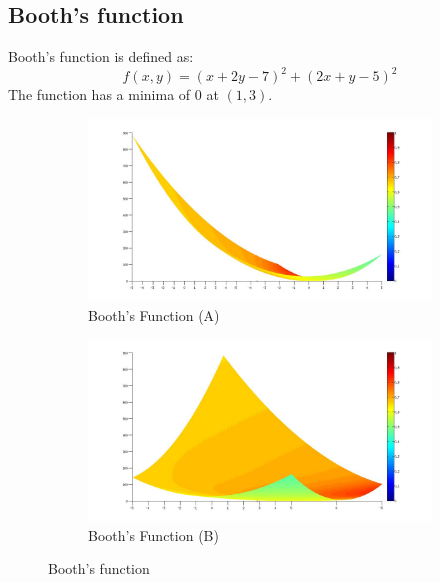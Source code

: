 \documentclass[ExampleMasters.tex]{subfiles}
\begin{document}
		\clearpage

		\subsection{Booth's function}

		Booth's function is defined as:
		\begin{equation}
			f(x,y)=(x+2y-7)^2+(2x+y-5)^2
		\end{equation}
		The function has a minima of 0 at $(1,3)$.

		\begin{figure}[hb!]
			\begin{subfigure}[b]{0.5\textwidth}
				\centering
				\includegraphics[width=1.2\textwidth]{figures/GeneticAlgorithm/BoothA.jpg}
				\caption{Booth's Function (A)}
				\label{B2A}
			\end{subfigure}
			\quad
			\begin{subfigure}[b]{0.5\textwidth}
				\includegraphics[width=1.2\textwidth]{figures/GeneticAlgorithm/BoothB.jpg}
				\caption{Booth's Function (B)}
				\label{B2B}
			\end{subfigure}
			\caption{Booth's function}
			\label{B2}
		\end{figure}
\end{document}
